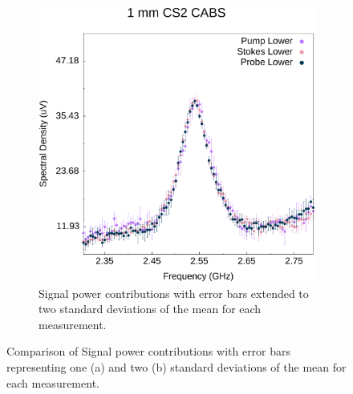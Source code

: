 \documentclass[%
  reprint,
  superscriptaddress,
  amsmath,amssymb,
  aps,
  prapplied,
]{revtex4-2}
\begin{document}
\begin{figure}[h]
\begin{subfigure}{0.45\textwidth}
    \includegraphics[width=\textwidth]{PSPr-Contribute-Equally-2sigma.pdf}
    \caption{Signal power contributions with error bars extended to two standard deviations of the mean for each measurement.}
    \label{fig:PSPr-Contribute-Equally-2sigma}
  \end{subfigure}
  \caption{Comparison of Signal power contributions with error bars representing one (a) and two (b) standard deviations of the mean for each measurement.}
  \label{fig:combined}
\end{figure}


\twocolumngrid

\end{document}

